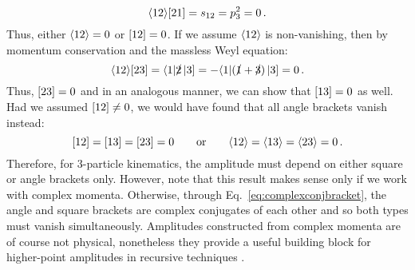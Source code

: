 \documentclass[main.tex]{subfiles}
\begin{document}
\begin{equation}
    \langle 12 \rangle[ 21 ] = s_{12} = p_3^2 = 0\,.
\end{equation}
Thus, either $\langle 12 \rangle = 0$ or $[ 12 ] = 0$. If we assume $\langle 12 \rangle$ is non-vanishing, then by momentum conservation and the massless Weyl equation:
\begin{equation}
    \langle 12 \rangle[ 23 ] = \langle 1|\slashed{2}\left| 3 \right] = -\langle 1|(\slashed{1}+\slashed{3})\left| 3 \right] = 0\,.
\end{equation}
Thus, $[ 23 ] = 0$ and in an analogous manner, we can show that $[ 13 ] = 0$ as well. Had we assumed $[ 12 ] \neq 0$, we would have found that all angle brackets vanish instead:
\begin{equation}
    [ 12 ] = [ 13 ] = [ 23 ] = 0 \qquad \text{or} \qquad \langle 12 \rangle = \langle 13 \rangle = \langle 23 \rangle = 0 \,.
\end{equation}
Therefore, for 3-particle kinematics, the amplitude must depend on either square or angle brackets only. However, note that this result makes sense only if we work with complex momenta. Otherwise, through Eq.~\ref{eq:complexconjbracket}, the angle and square brackets are complex conjugates of each other and so both types must vanish simultaneously. Amplitudes constructed from complex momenta are of course not physical, nonetheless they provide a useful building block for higher-point amplitudes in recursive techniques .
\end{document}
